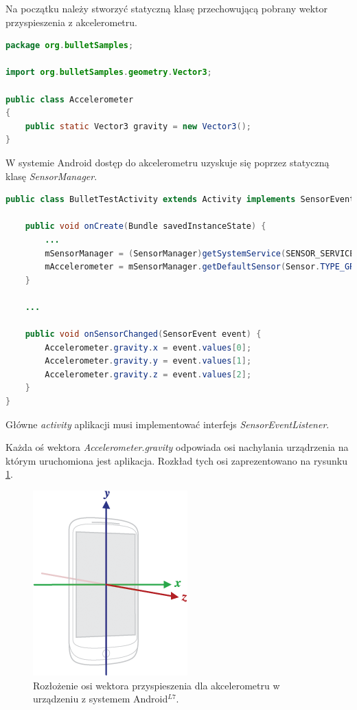 Na początku należy stworzyć statyczną klasę przechowującą pobrany wektor
przyspieszenia z akcelerometru.

\begin{lstlisting}[language=java, caption=Klasa Accelerometer przechowująca
dane pobrane z akcelerometru.]
package org.bulletSamples;
 
import org.bulletSamples.geometry.Vector3;
 
public class Accelerometer
{
	public static Vector3 gravity = new Vector3();
}
\end{lstlisting}

W systemie Android dostęp do akcelerometru uzyskuje się poprzez statyczną klasę
\emph{SensorManager}.

\begin{lstlisting}[language=java, caption=Pobranie wektora przyspieszenia z
akcelerometru.] public class BulletTestActivity extends Activity implements SensorEventListener {

	public void onCreate(Bundle savedInstanceState) {
		...
		mSensorManager = (SensorManager)getSystemService(SENSOR_SERVICE);
		mAccelerometer = mSensorManager.getDefaultSensor(Sensor.TYPE_GRAVITY);
    }
    
	...
    
    public void onSensorChanged(SensorEvent event) {
		Accelerometer.gravity.x = event.values[0];
		Accelerometer.gravity.y = event.values[1];
		Accelerometer.gravity.z = event.values[2];
	}
}
\end{lstlisting}

Główne \emph{activity} aplikacji musi implementować interfejs
\emph{SensorEventListener}. 

Każda oś wektora \emph{Accelerometer}.\emph{gravity} odpowiada osi nachylania
urządrzenia na którym uruchomiona jest aplikacja. Rozkład tych osi
zaprezentowano na rysunku \ref{fig:axis_device}.

\begin{figure}[H]
\centering
\includegraphics[scale = 0.6]{./img/axis_device.png}
\caption{Rozłożenie osi wektora przyspieszenia dla akcelerometru w urządzeniu
z systemem Android$ ^{L7} $.}
\label{fig:axis_device}
\end{figure}

